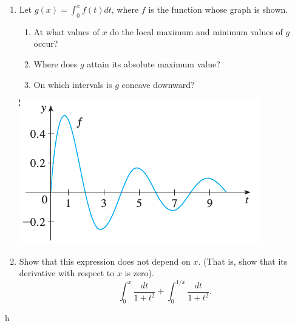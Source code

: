 \documentclass[12pt]{article}
\begin{document}
\begin{multicols*}{2}
\begin{enumerate}
		\item Let $g(x) = \int_0^x f(t)dt$, where $f$ is the function whose graph is shown.
		\begin{enumerate}
			\item At what values of $x$ do the local maximum and minimum values of $g$ occur?
			\item Where does $g$ attain its absolute maximum value?
			\item On which intervals is $g$ concave downward?
		\end{enumerate}
		\includegraphics[scale=.6]{74_pic.png}

		\vfill

		\item Show that this expression does not depend on $x$. (That is, show that its derivative with respect to $x$ is zero).
		\[
		\int_0^x \frac{dt}{1+t^2} + \int_0^{1/x}\frac{dt}{1+t^2}.
		\]

		\vfill\null\pagebreak
	\end{enumerate}
\end{multicols*}


h
\end{document}
